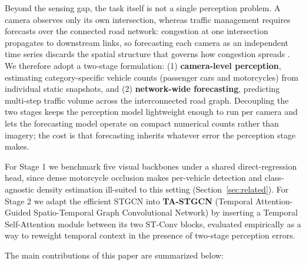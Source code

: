\documentclass[preprint,12pt]{elsarticle}
\begin{document}
Beyond the sensing gap, the task itself is not a single perception problem. A camera observes only its own intersection, whereas traffic management requires forecasts over the connected road network: congestion at one intersection propagates to downstream links, so forecasting each camera as an independent time series discards the spatial structure that governs how congestion spreads \citep{ctm}. We therefore adopt a two-stage formulation: (1) \textbf{camera-level perception}, estimating category-specific vehicle counts (passenger cars and motorcycles) from individual static snapshots, and (2) \textbf{network-wide forecasting}, predicting multi-step traffic volume across the interconnected road graph. Decoupling the two stages keeps the perception model lightweight enough to run per camera and lets the forecasting model operate on compact numerical counts rather than imagery; the cost is that forecasting inherits whatever error the perception stage makes.

For Stage 1 we benchmark five visual backbones under a shared direct-regression head, since dense motorcycle occlusion makes per-vehicle detection and class-agnostic density estimation ill-suited to this setting (Section~\ref{sec:related}). For Stage 2 we adapt the efficient STGCN \citep{stgcn} into \textbf{TA-STGCN} (Temporal Attention-Guided Spatio-Temporal Graph Convolutional Network) by inserting a Temporal Self-Attention module \citep{attention} between its two ST-Conv blocks, evaluated empirically as a way to reweight temporal context in the presence of two-stage perception errors.

The main contributions of this paper are summarized below:
\end{document}
